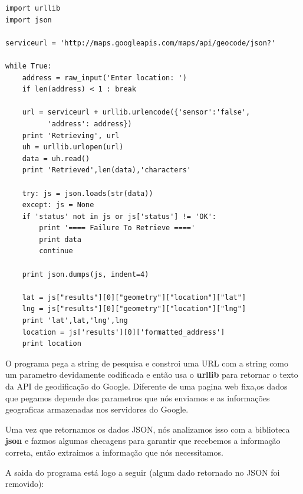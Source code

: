 \beforeverb
\begin{verbatim}
import urllib
import json

serviceurl = 'http://maps.googleapis.com/maps/api/geocode/json?'

while True:
    address = raw_input('Enter location: ')
    if len(address) < 1 : break

    url = serviceurl + urllib.urlencode({'sensor':'false', 
          'address': address})
    print 'Retrieving', url
    uh = urllib.urlopen(url)
    data = uh.read()
    print 'Retrieved',len(data),'characters'

    try: js = json.loads(str(data))
    except: js = None
    if 'status' not in js or js['status'] != 'OK':
        print '==== Failure To Retrieve ===='
        print data
        continue

    print json.dumps(js, indent=4)

    lat = js["results"][0]["geometry"]["location"]["lat"]
    lng = js["results"][0]["geometry"]["location"]["lng"]
    print 'lat',lat,'lng',lng
    location = js['results'][0]['formatted_address']
    print location
\end{verbatim}
\afterverb
%
O programa pega a string de pesquisa e constroi uma URL com a string
como um parametro devidamente codificada e então usa o {\bf urllib}
para retornar o texto da API de geodificação do Google. Diferente
de uma pagina web fixa,os dados que pegamos depende dos parametros 
que nós enviamos e as informações geograficas armazenadas nos 
servidores do Google.

Uma vez que retornamos os dados JSON, nós analizamos isso com a 
biblioteca {\bf json} e fazmos algumas checagens para garantir que 
recebemos a informação correta, então extraimos a informação que 
nós necessitamos.

A saida do programa está logo a seguir (algum dado retornado no JSON
foi removido):

